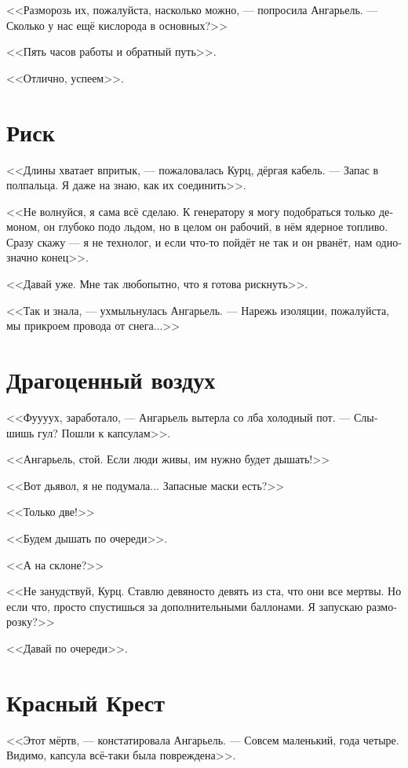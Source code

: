 \documentclass[a4paper,12pt,fleqn]{book}\usepackage{polyglossia}\setdefaultlanguage[babelshorthands=true]{russian}\setotherlanguage{english}\defaultfontfeatures{Ligatures=TeX,Mapping=tex-text}\usepackage{xcolor}\newcommand{\ml}[3]{#2}
\begin{document}
<<Разморозь их, пожалуйста, насколько можно, --- попросила Ангарьель.
--- Сколько у нас ещё кислорода в основных?>>

<<Пять часов работы и обратный путь>>.

<<Отлично, успеем>>.

\section{Риск}

<<Длины хватает впритык, --- пожаловалась Курц, дёргая кабель.
--- Запас в полпальца.
Я даже на знаю, как их соединить>>.

<<Не волнуйся, я сама всё сделаю.
К генератору я могу подобраться только демоном, он глубоко подо льдом, но в целом он рабочий, в нём ядерное топливо.
Сразу скажу --- я не технолог, и если что-то пойдёт не так и он рванёт, нам однозначно конец>>.

<<Давай уже.
Мне так любопытно, что я готова рискнуть>>.

<<Так и знала, --- ухмыльнулась Ангарьель.
--- Нарежь изоляции, пожалуйста, мы прикроем провода от снега...>>

\section{Драгоценный воздух}

<<Фуууух, заработало, --- Ангарьель вытерла со лба холодный пот.
--- Слышишь гул?
Пошли к капсулам>>.

<<Ангарьель, стой.
Если люди живы, им нужно будет дышать!>>

<<Вот дьявол, я не подумала...
Запасные маски есть?>>

<<Только две!>>

<<Будем дышать по очереди>>.

<<А на склоне?>>

<<Не занудствуй, Курц.
Ставлю девяносто девять из ста, что они все мертвы.
Но если что, просто спустишься за дополнительными баллонами.
Я запускаю разморозку?>>

<<Давай по очереди>>.

\section{Красный Крест}

<<Этот мёртв, --- констатировала Ангарьель.
--- Совсем маленький, года четыре.
Видимо, капсула всё-таки была повреждена>>.
\end{document}
